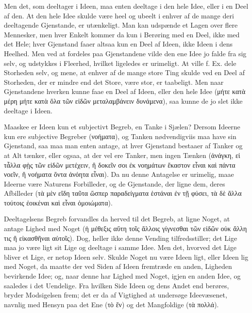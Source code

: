 \documentclass[12pt]{book}
\newcommand{\opage}[1]{\marginnote{\footnotesize\textit{[#1]}}}
\begin{document}
Men det, som deeltager i Ideen, maa enten deeltage i den hele Idee, eller i en Deel af den. At
den hele Idee skulde være heel og ubeelt i enhver af de mange deri deeltagende Gjenstande, er
utænkeligt. Man kan udspænde et Lagen over flere Mennesker, men hver Enkelt kommer da kun i
Berøring med en Deel, ikke med det Hele; hver Gjenstand faaer altsaa kun en Deel af Ideen, ikke
Ideen i dens Heelhed. Men ved at fordeles paa Gjenstandene vilde den ene Idee jo falde fra sig
selv, og udstykkes i Fleerhed, hvilket ligeledes er urimeligt. At ville f. Ex. dele Storheden
selv, og mene, at enhver af de mange store Ting skulde ved en Deel af Storheden, der er mindre
end det Store, være stor, er taabeligt. Men naar Gjenstandene hverken kunne faae en Deel af
Ideen, eller den hele Idee (μήτε κατὰ μέρη
\opage{131} μήτε κατὰ ὅλα τῶν εἰδῶν μεταλαμβάνειν δυνάμενα), saa kunne de jo slet ikke deeltage i Ideen.

Maaskee er Ideen kun et subjectivt Begreb, en Tanke i Sjælen? Dersom Ideerne kun ere subjective
Begreber (νοήματα), og Tanken nødvendigviis maa have sin Gjenstand, saa maa man enten antage, at
hver Gjenstand bestaaer af Tanker og at Alt tænker, eller ogsaa, at der vel ere Tanker, men ingen
Tænken (ἀνάγκη, εἰ τἆλλα φῂς τῶν εἰδῶν μετέχειν, ἢ δοκεῖν σοι ἐκ νοημάτων ἕκαστον εἶναι καὶ πάντα
νοεῖν, ἢ νοήματα ὄντα ἀνόητα εἶναι). Da nu denne Antagelse er urimelig, maae Ideerne være Naturens
Forbilleder, og de Gjenstande, der ligne dem, deres Afbilleder (τὰ μὲν εἴδη ταῦτα ὥσπερ
παραδείγματα ἑστάναι ἐν τῇ φύσει, τὰ δὲ ἄλλα τούτοις ἐοικέναι καὶ εἶναι ὁμοιώματα).

Deeltagelsens Begreb forvandles da herved til det Begreb, at ligne Noget, at antage Lighed med
Noget (ἡ μέθεξις αὕτη τοῖς ἄλλοις γίγνεσθαι τῶν εἰδῶν οὐκ ἄλλη τις ἢ εἰκασθῆναι αὐτοῖς). Dog,
heller ikke denne Vending tilfredsstiller; det Lige maa jo være ligt sit Lige og deeltage i
samme Idee. Men det, hvorved det Lige bliver et Lige, er netop Ideen selv. Skulde Noget nu være
Ideen ligt, eller Ideen lig med Noget, da maatte der ved Siden af Ideen fremtræde en anden,
Ligheden bevirkende Idee; og, naar denne har Lighed med Noget, igjen en anden Idee, og saaledes
i det Uendelige. Fra hvilken Side Ideen og dens Andet end berøres, bryder Modsigelsen frem; det
er da af Vigtighed at undersøge Ideevæsenet, navnlig med Hensyn paa det Ene (τὸ ἕν) og det
Mangfoldige (τὰ πολλά).
\end{document}
